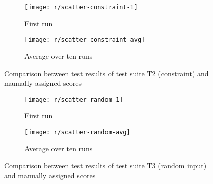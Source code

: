 \begin{figure}[htpb]
    \centering
    \begin{subfigure}{.85\textwidth}
        \texttt{[image: r/scatter-constraint-1]}
        \caption{First run}
        \label{fig:scatter_constraint_1}
    \end{subfigure}

    \bigskip

    \begin{subfigure}{.85\textwidth}
        \texttt{[image: r/scatter-constraint-avg]}
        \caption{Average over ten runs}
        \label{fig:scatter_constraint_avg}
    \end{subfigure}
    \caption{Comparison between test results of test suite T2 (constraint) and manually assigned scores}
    \label{fig:scatter_constraint}
\end{figure}

\begin{figure}[htpb]
    \centering
    \begin{subfigure}{.85\textwidth}
        \texttt{[image: r/scatter-random-1]}
        \caption{First run}
        \label{fig:scatter_random_1}
    \end{subfigure}

    \bigskip

    \begin{subfigure}{.85\textwidth}
        \texttt{[image: r/scatter-random-avg]}
        \caption{Average over ten runs}
        \label{fig:scatter_random_avg}
    \end{subfigure}
    \caption{Comparison between test results of test suite T3 (random input) and manually assigned scores}
    \label{fig:scatter_random}
\end{figure}

